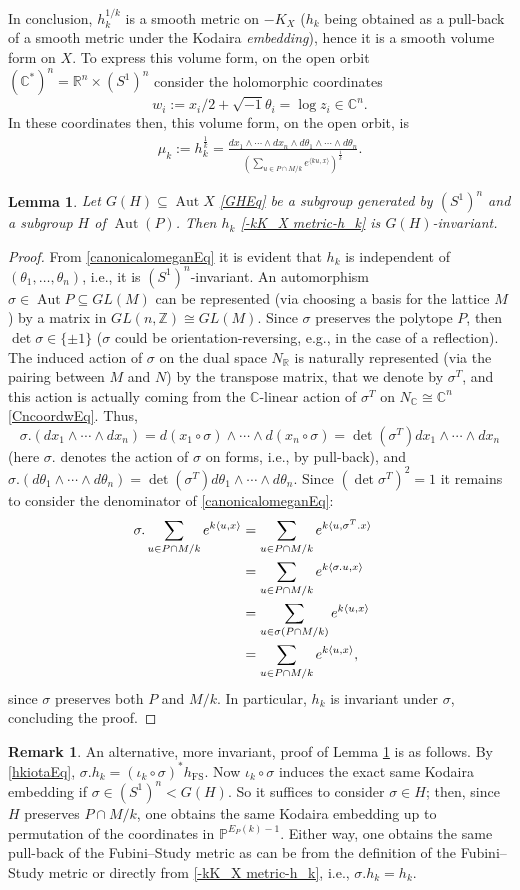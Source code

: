 \documentclass{article}
\newcommand{\FS}{\mathrm{FS}}
\newcommand{\CC}{\mathbb {C}}
\newcommand{\PP}{{\mathbb P}}
\newcommand{\RR}{{\mathbb R}}
\newcommand{\ZZ}{{\mathbb Z}}
\renewcommand{\>}{\rightarrow}
\DeclareMathOperator{\Aut}{Aut}
\theoremstyle{plain}
\newtheorem{lemma}[theorem]{Lemma}
\theoremstyle{definition}
\newtheorem{remark}[theorem]{Remark}
\newcommand{\beq}{\begin{equation}}
\newcommand{\eeq}{\end{equation}}
\newcommand{\bpf}{\begin{proof}}
\newcommand{\epf}{\end{proof}}
\newcommand{\bremark}{\begin{remark}}
\newcommand{\eremark}{\end{remark}}
\newcommand{\blem}{\begin{lemma}}
\newcommand{\elem}{\end{lemma}}
\def\lb#1{\label{#1}}
\begin{document}
In conclusion, $h_k^{1/k}$ is a smooth metric on $-K_X$ ($h_k$ being obtained
as a pull-back of a smooth metric under the Kodaira {\it embedding}), 
hence it is a smooth volume form on $X$.
To express this volume form, 
on the open orbit $(\CC^*)^n=\RR^n\times (S^1)^n$ consider the holomorphic coordinates
\beq
\lb{CncoordwEq}
w_i:=x_i/2+\sqrt{-1}\theta_i=\log z_i\in\CC^n.
\eeq
In these coordinates then, this volume form, on the open orbit, is
    \begin{align}
\label{canonicalomeganEq}
\mu_k:=h_k^\frac{1}{k}=\frac{dx_1\wedge\cdots\wedge dx_n\wedge d\theta_1\wedge\cdots\wedge d\theta_n}{\left(\sum\limits_{u\in P\cap M/k}e^{\langle ku,x\rangle}\right)^{\frac{1}{k}}}.
\end{align}
\blem
\lb{hkGinvLem}
Let $G(H)\subseteq\Aut X$ \eqref{GHEq} be a subgroup generated by $(S^1)^n$ and a subgroup $H$ of $\Aut(P)$. Then $h_k$ \eqref{-kK_X metric-h_k} is $G(H)$-invariant.
\elem
\bpf
From \eqref{canonicalomeganEq} it is evident that $h_k$ is independent
of $(\theta_1,\ldots,\theta_n)$, i.e., it is $(S^1)^n$-invariant.
An automorphism $\sigma\in\Aut P\subseteq GL(M)$
can be represented (via choosing a basis for the lattice $M$) 
by a matrix in $GL(n,\ZZ)\cong GL(M)$. Since $\sigma$
preserves the polytope $P$, then $\det\sigma\in\{\pm 1\}$
($\sigma$
could be orientation-reversing, e.g., in the case of a reflection).
The induced action
of $\sigma$ on the dual space $N_\RR$ is naturally represented (via 
the pairing between $M$ and $N$) by the transpose matrix, that we
denote by  $\sigma^T$, and this action is actually coming
from the $\CC$-linear action of $\sigma^T$ on $N_\CC\cong\CC^n$
\eqref{CncoordwEq}.
Thus,
$$
\sigma.(dx_1\wedge\cdots\wedge dx_n)
=
d(x_1\circ\sigma)\wedge\cdots\wedge d(x_n\circ\sigma)
=
\det(\sigma^T)dx_1\wedge\cdots\wedge dx_n
$$
(here $\sigma.$ denotes the action of $\sigma$ on forms, i.e., by pull-back),
and
$\sigma.(d\theta_1\wedge\cdots\wedge d\theta_n)
=
\det(\sigma^T)
d\theta_1\wedge\cdots\wedge d\theta_n
$.
Since $(\det\sigma^T)^2=1$ it remains to consider the denominator
of \eqref{canonicalomeganEq}: 
\begin{align*}
\sigma.
\sum\limits_{u\in P\cap M/k}e^{k\langle u,x\rangle}
&=
\sum\limits_{u\in P\cap M/k}e^{k\langle u,\sigma^T.x\rangle}\cr
&=
\sum\limits_{u\in P\cap M/k}e^{k\langle \sigma.u,x\rangle}\cr
&=
\sum\limits_{u\in \sigma(P\cap M/k)}e^{k\langle u,x\rangle}\cr
&=
\sum\limits_{u\in P\cap M/k}e^{k\langle u,x\rangle},\cr
\end{align*}
since $\sigma$ preserves both $P$ and $M/k$.
In particular, $h_k$ is invariant under $\sigma$, concluding the proof.
\epf
\bremark
An alternative, more invariant, proof of Lemma \ref{hkGinvLem}
is as follows. By \eqref{hkiotaEq}, $\sigma.h_k=(\iota_k\circ\sigma)^*h_{\FS}$.
Now $\iota_k\circ\sigma$ induces the exact same Kodaira embedding 
if $\sigma\in (S^1)^n<G(H)$. So it suffices to consider $\sigma\in H$; then, since $H$ preserves 
$P\cap M/k$, one obtains the same Kodaira embedding up to permutation of the 
coordinates in $\PP^{E_P(k)-1}$. Either way, one obtains the same pull-back
of the Fubini--Study metric as can be from the definition of the Fubini--Study metric
or directly from \eqref{-kK_X metric-h_k}, i.e., $\sigma.h_k=h_k$.
\eremark
\end{document}
